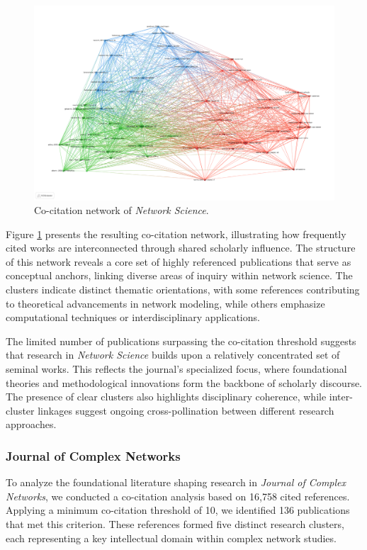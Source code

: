 \documentclass[twocolumn]{article}
\begin{document}
		\begin{figure}[htbp]
			\centering
			\includegraphics[width=\columnwidth]{"Network Science/VOS/Co-citation.pdf"}
			\caption{Co-citation network of \textit{Network Science}.}
			\label{fig.fig9}
		\end{figure}
		
		Figure \ref{fig.fig9} presents the resulting co-citation network, illustrating how frequently cited works are interconnected through shared scholarly influence. The structure of this network reveals a core set of highly referenced publications that serve as conceptual anchors, linking diverse areas of inquiry within network science. The clusters indicate distinct thematic orientations, with some references contributing to theoretical advancements in network modeling, while others emphasize computational techniques or interdisciplinary applications.
		
		The limited number of publications surpassing the co-citation threshold suggests that research in \textit{Network Science} builds upon a relatively concentrated set of seminal works. This reflects the journal’s specialized focus, where foundational theories and methodological innovations form the backbone of scholarly discourse. The presence of clear clusters also highlights disciplinary coherence, while inter-cluster linkages suggest ongoing cross-pollination between different research approaches.
		
		
		\subsubsection*{Journal of Complex Networks}
		
		To analyze the foundational literature shaping research in \textit{Journal of Complex Networks}, we conducted a co-citation analysis based on 16,758 cited references. Applying a minimum co-citation threshold of 10, we identified 136 publications that met this criterion. These references formed five distinct research clusters, each representing a key intellectual domain within complex network studies.
		
\end{document}
